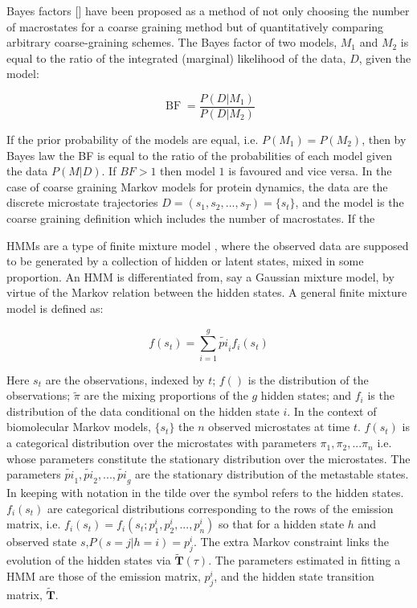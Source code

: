 Bayes factors [] have been proposed as a method of not only choosing the number of macrostates for a coarse graining method but of quantitatively comparing arbitrary coarse-graining schemes. The Bayes factor of two models, $M_{1}$ and $M_{2}$ is equal to the ratio of the integrated (marginal) likelihood of the data, $D$, given the model: 

\begin{equation}
\operatorname{BF} = \frac{P(D|M_1)}{P(D|M_2)}
\end{equation}

If the prior probability of the models are equal, i.e. $P(M_1)=P(M_2)$, then by Bayes law the BF is equal to the ratio of the probabilities of each model given the data $P(M|D)$. If $BF > 1$ then model $1$ is favoured and vice versa. In the case of coarse graining Markov models for protein dynamics, the data are the discrete microstate trajectories $D = (s_1, s_2, ..., s_T)= \{s_t\}$, and the model is the coarse graining definition which includes the number of macrostates. If the  

HMMs are a type of finite mixture model \cite{mclachlanFiniteMixtureModels2000}, where the observed data are supposed to be generated by a collection of hidden or latent states, mixed in some proportion. An HMM is differentiated from, say a Gaussian mixture model, by virtue of the Markov relation between the hidden states. A general finite mixture model is defined as: 

\begin{equation}
    f(s_{t}) = \sum_{i=1}^{g}\tilde{pi}_{i} f_{i}(s_{t})
\end{equation}

Here $s_{t}$ are the observations, indexed by $t$; $f()$ is the distribution of the observations; $\tilde{\pi}$ are the mixing proportions of the $g$ hidden states; and $f_{i}$ is the distribution of the data  conditional on the hidden state $i$. In the context of biomolecular Markov models, $\{s_t\}$ the $n$ observed microstates at time $t$. $f(s_{t})$ is a categorical distribution over the  microstates with parameters $\pi_1, \pi_2, ... \pi_n$ i.e. whose parameters constitute the stationary distribution over the microstates. The parameters  $\tilde{pi}_{1},\tilde{pi}_{2}, ..., \tilde{pi}_{g}$ are the stationary distribution of the metastable states. In keeping with notation in \cite{noeProjectedHiddenMarkov2013a} the tilde over the symbol refers to the hidden states.  $f_{i}(s_t)$ are categorical distributions corresponding to the rows of the emission matrix, i.e. $f_{i}(s_t)= f_{i}(s_t; p^{i}_1, p^{i}_2, ..., p^{i}_n)$ so that for a hidden state $h$ and observed state $s$,$P(s=j|h=i) = p^{i}_{j}$. The extra Markov constraint links the evolution of the hidden states via $\tilde{\mathbf{T}}(\tau)$. The parameters estimated in fitting a HMM are those of the emission matrix, $p^{i}_{j}$, and the hidden state transition matrix, $\tilde{\mathbf{T}}$.

